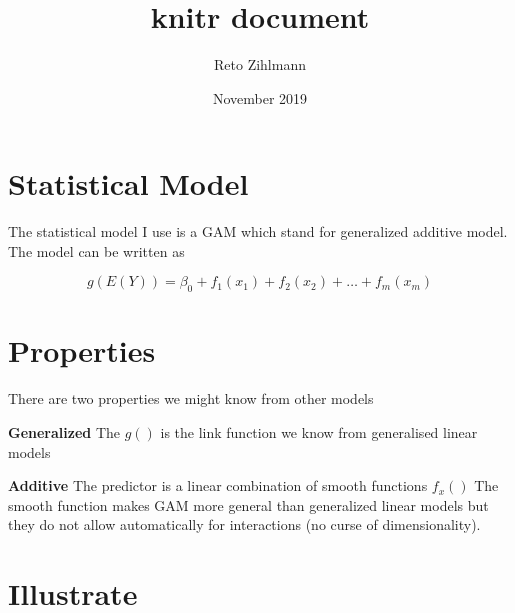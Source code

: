 \documentclass{article}\usepackage[]{graphicx}\usepackage[]{color}
\title{knitr document}
\author{Reto Zihlmann}
\date{November 2019}
\begin{document}
\maketitle

\section{Statistical Model}


The statistical model I use is a GAM which stand for generalized additive model. The model can be written as

$$
g(E(Y)) = \beta_0 + f_1(x_1) + f_2(x_2) + \dots + f_m(x_m)
$$

\section{Properties}

There are two properties we might know from other models

\textbf{Generalized} The $g()$ is the link function we know from generalised linear models

\textbf{Additive} The predictor is a linear combination of smooth functions $f_x()$ The smooth function makes GAM more general than generalized linear models but they do not allow automatically for interactions (no curse of dimensionality).


\section{Illustrate}
\end{document}
